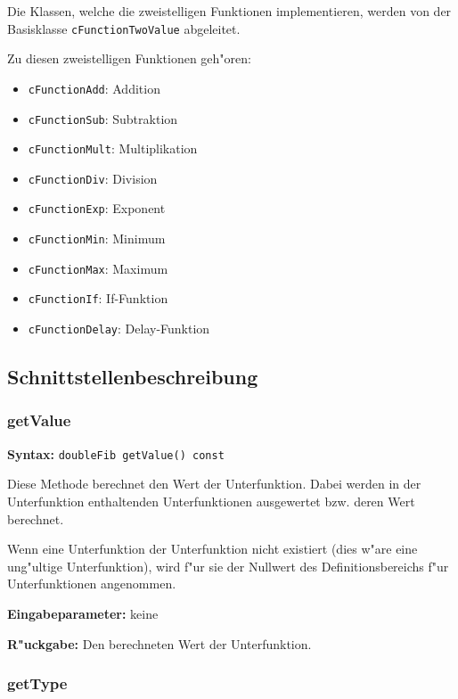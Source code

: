 \bigskip\noindent
Die Klassen, welche die zweistelligen Funktionen implementieren, werden von der Basisklasse \verb|cFunctionTwoValue| abgeleitet.

\bigskip\noindent
Zu diesen zweistelligen Funktionen geh"oren:
\begin{itemize}
 \item \verb|cFunctionAdd|: Addition
 \item \verb|cFunctionSub|: Subtraktion
 \item \verb|cFunctionMult|: Multiplikation
 \item \verb|cFunctionDiv|: Division
 \item \verb|cFunctionExp|: Exponent
 \item \verb|cFunctionMin|: Minimum
 \item \verb|cFunctionMax|: Maximum
 \item \verb|cFunctionIf|: If-Funktion
 \item \verb|cFunctionDelay|: Delay-Funktion
\end{itemize}


\subsection{Schnittstellenbeschreibung}

\subsubsection{getValue}

\textbf{Syntax:} \verb|doubleFib getValue() const|

\bigskip\noindent
Diese Methode berechnet den Wert der Unterfunktion. Dabei werden in der Unterfunktion enthaltenden Unterfunktionen ausgewertet bzw. deren Wert berechnet.

Wenn eine Unterfunktion der Unterfunktion nicht existiert (dies w"are eine ung"ultige Unterfunktion), wird f"ur sie der Nullwert des Definitionsbereichs f"ur Unterfunktionen angenommen.

\bigskip\noindent
\textbf{Eingabeparameter:} keine

\bigskip\noindent
\textbf{R"uckgabe:} Den berechneten Wert der Unterfunktion.


\subsubsection{getType}


